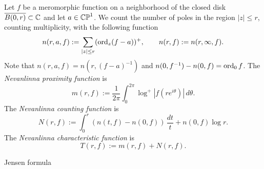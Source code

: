 \documentclass{../../large}
\begin{document}
\begin{prb}
\end{prb}

\begin{prb}
Let $f$ be a meromorphic function on a neighborhood of the closed disk $\overline{B(0,r)}\subset\mathbb{C}$ and let $a\in\mathbb{CP}^1$.
We count the number of poles in the region $|z|\le r$, counting multiplicity, with the following function
\[n(r,a,f):=\sum_{|z|\le r}(\operatorname{ord}_z(f-a))^+,\qquad n(r,f):=n(r,\infty,f).\]
Note that $n(r,a,f)=n(r,(f-a)^{-1})$ and $n(0,f^{-1})-n(0,f)=\operatorname{ord}_0f$.
The \emph{Nevanlinna proximity function} is
\[m(r,f):=\frac1{2\pi}\int_0^{2\pi}\log^+|f(re^{i\theta})|\,d\theta.\]
The \emph{Nevanlinna counting function} is
\[N(r,f):=\int_0^r(n(t,f)-n(0,f))\,\frac{dt}t+n(0,f)\log r.\]
The \emph{Nevanlinna characteristic function} is
\[T(r,f):=m(r,f)+N(r,f).\]
\end{prb}


\begin{prb}
Jensen formula
\end{prb}

\begin{prb}
\end{prb}
\end{document}
